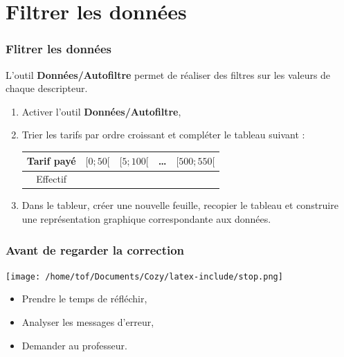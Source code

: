 \documentclass[svgnames,11pt]{beamer}
\begin{document}
\section{Filtrer les données}
\begin{frame}
    \frametitle{Flitrer les données}

    L’outil \textbf{Données/Autofiltre} permet de réaliser des filtres sur les valeurs de chaque descripteur.
    \begin{activite}
    \begin{enumerate}
        \item  Activer l'outil \textbf{Données/Autofiltre},
        \item Trier les tarifs par ordre croissant et compléter le tableau suivant :
        \begin{center}
            \begin{tabular}{|*{5}{c|}}
                \hline
                Tarif payé & $[0;50[$& $[5;100[$& \dots& $[500;550[$\\
                \hline
                Effectif&&&&\\
                \hline
            \end{tabular}
        \end{center}
        \item Dans le tableur, créer une nouvelle feuille, recopier le tableau et construire une représentation graphique correspondante aux données.
    \end{enumerate}
    \end{activite}

\end{frame}
\begin{frame}
    \frametitle{Avant de regarder la correction}
\begin{center}
    \centering
    \texttt{[image: /home/tof/Documents/Cozy/latex-include/stop.png]}
    \end{center}
{\Large
    \begin{itemize}
        \item Prendre le temps de réfléchir,
        \item Analyser les messages d'erreur,
        \item Demander au professeur.
    \end{itemize}
}
\end{frame}
\end{document}
